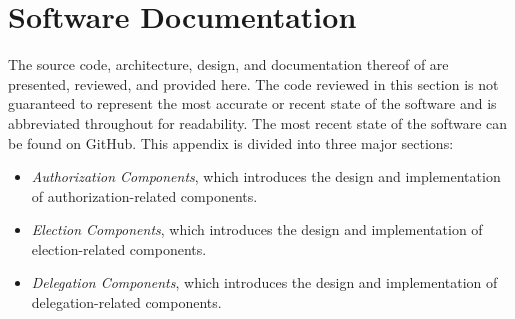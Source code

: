 \chapter{Software Documentation}\label{appendix:documentation}

The source code, architecture, design, and documentation thereof of are
presented, reviewed, and provided here. The code reviewed in this section is not
guaranteed to represent the most accurate or recent state of the software and
is abbreviated throughout for readability. The most recent state of the
software can be found on GitHub.\cite{election-contracts} This appendix is
divided into three major sections:

\begin{itemize}
  \item \emph{Authorization Components}, which introduces the design and
    implementation of authorization-related components.

  \item \emph{Election Components}, which introduces the design and
    implementation of election-related components.

  \item \emph{Delegation Components}, which introduces the design and
    implementation of delegation-related components.
\end{itemize}







